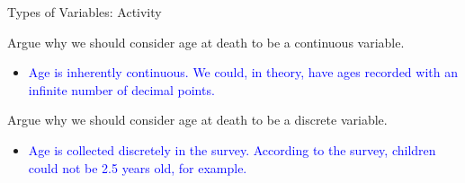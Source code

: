\documentclass[10pt,t]{beamer}
\begin{document}
\begin{frame}{Types of Variables: Activity}

Argue why we should consider age at death to be a continuous variable.
	
	\vspace{0.3cm}
	
	\begin{itemize}
		\item[] \textcolor{blue}{Age is inherently continuous. We could, in theory, have ages recorded with an infinite number of decimal points.}
	\end{itemize}
	
		
	
	\vspace{0.3cm}
	
	Argue why we should consider age at death to be a discrete variable.
	
	\vspace{0.3cm}
	
	\begin{itemize}
		\item[] 	\textcolor{blue}{Age is collected discretely in the survey. According to the survey, children could not be 2.5 years old, for example. }
	\end{itemize}

	

\end{frame}
\end{document}
